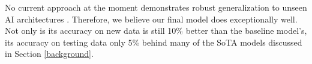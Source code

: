 \documentclass{article} %
\begin{document}
No current approach at the moment demonstrates robust generalization to unseen AI architectures \citep{Mubarak2023}. Therefore, we believe our final model does exceptionally well. Not only is its accuracy on new data is still 10\% better than the baseline model's, its accuracy on testing data only 5\% behind many of the SoTA models discussed in Section \ref{background}.

\label{last_page}



\end{document}
